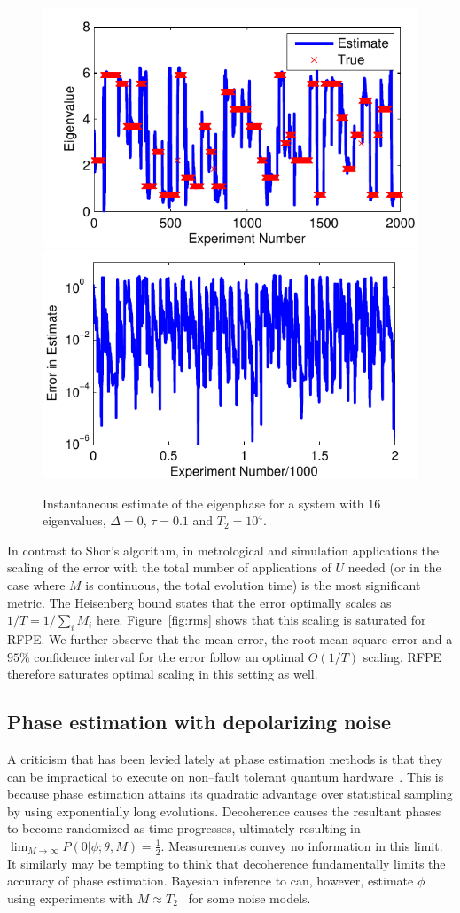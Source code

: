 \documentclass[aps,pra,amsmath,twocolumn,amssymb,superscriptaddress]{revtex4-1}
\newcommand{\fig}[1]{\hyperref[fig:#1]{Figure~\ref*{fig:#1}}}
\begin{document}
\begin{figure}
    \begin{centering}
        \includegraphics[width=0.4\linewidth]{Errtrack1.pdf}
        \hspace{5mm}
        \includegraphics[width=0.4\linewidth]{Errtrack2.pdf}
    \end{centering}
    \caption{\label{fig:Errplot}
        Instantaneous estimate of the eigenphase  for a system with $16$ eigenvalues, $\Delta=0$, $\tau=0.1$ and $T_2=10^4$.
    }
\end{figure}

In contrast to Shor's algorithm, in metrological and simulation applications the scaling of the error with the total number of applications of $U$ needed  (or in the case where $M$ is continuous, the total evolution time) is the most significant metric.
The Heisenberg bound states that the error optimally scales as $1/T=1/\sum_i M_i$ here.
\fig{rms} shows that this scaling is saturated for RFPE.  We further observe that the mean error, the
root-mean square error and a $95\%$ confidence interval for the error follow an optimal $O(1/T)$ scaling.
RFPE therefore saturates optimal scaling in this setting as well.




\subsection{Phase estimation with depolarizing noise}
A criticism that has been levied lately at phase estimation methods is that they can be impractical to execute on non--fault tolerant quantum hardware~\cite{PMS+14,MBL+14,WHT15}.  This is because phase estimation attains its quadratic advantage over statistical sampling by using exponentially long evolutions.  Decoherence causes the resultant phases to become randomized as time progresses, ultimately resulting in
$\lim_{M\rightarrow \infty} P(0|\phi;\theta,M) = \frac{1}{2}$.
Measurements convey no information in this limit.  It similarly may be tempting to think that decoherence fundamentally limits the accuracy of phase estimation.   Bayesian inference to can, however, estimate $\phi$ using experiments with $M \approx T_2$~\cite{granade_robust_2012} for some noise models.  
\end{document}
